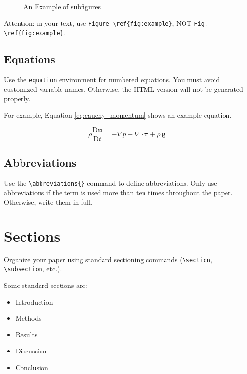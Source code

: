 \documentclass[
  manuscript=article,  %
  layout=preprint,  %
  year=20xx,
  volume=x,
]{extra/joas}
\begin{document}
\begin{figure}[htbp!]
  \centering
  \hspace{0.2cm}
  \caption{An Example of subfigures}
  \label{fig:subfig_example}
\end{figure}

Attention: in your text, use \verb|Figure \ref{fig:example}|, NOT \verb|Fig. \ref{fig:example}|.


\subsection{Equations}
Use the \verb|equation| environment for numbered equations. You must avoid customized variable names. Otherwise, the HTML version will not be generated properly.

For example, Equation \ref{eq:cauchy_momentum} shows an example equation.

\begin{equation} \label{eq:cauchy_momentum}
\rho\frac{\mathrm{D} \mathbf{u}}{\mathrm{D} t} = - \nabla p + \nabla \cdot \boldsymbol \tau + \rho\,\mathbf{g}
\end{equation}

\subsection{Abbreviations}
Use the \verb|\abbreviations{}| command to define abbreviations. Only use abbreviations if the term is used more than ten times throughout the paper. Otherwise, write them in full.


\section{Sections}

Organize your paper using standard sectioning commands (\verb|\section|, \verb|\subsection|, etc.).

Some standard sections are:

\begin{itemize}
  \item Introduction
  \item Methods
  \item Results
  \item Discussion
  \item Conclusion
\end{itemize}
\end{document}
